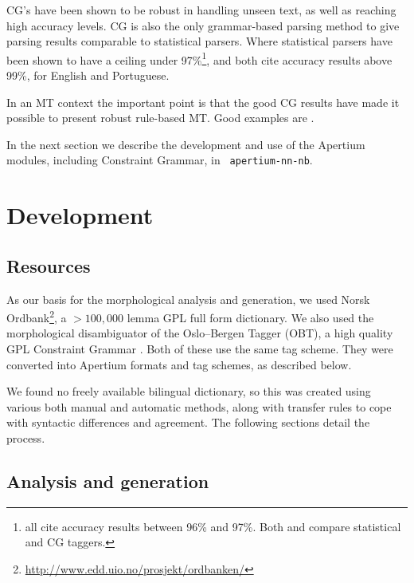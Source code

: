\documentclass[11pt]{article}
\begin{document}
CG's have been shown to be robust in handling unseen text, as well as
reaching high accuracy levels. CG is also the only grammar-based
parsing method to give parsing results comparable to statistical
parsers. Where statistical parsers have been shown to have a ceiling
under 97\%\footnote{\citet{leech1994claws, brants2000tnt,
    brill1997uld} all cite accuracy results between 96\% and
  97\%. Both \citet{chanod1995tfc} and \citet{samuelsson1997cls}
  compare statistical and CG taggers.},
\citet{voutilainen1994engcg} and \citet{bick2000palavras} both cite
accuracy results above 99\%, for English and Portuguese. 

In an MT context the important point is that the good CG results have 
made it possible to present robust rule-based MT. Good examples are
\citet{bick2007fmw}. %

In the next section we describe the development and use of the
Apertium modules, including Constraint Grammar, in {\tt
  apertium-nn-nb}.

\section{Development}

  \label{sec:development}
\subsection{Resources}

As our basis for the morphological analysis and generation, we used
Norsk
Ordbank\footnote{\href{http://www.edd.uio.no/prosjekt/ordbanken/}{http://www.edd.uio.no/prosjekt/ordbanken/}
}, a $>100,000$ lemma GPL full form dictionary. We also used the
morphological disambiguator of the Oslo–Bergen Tagger (OBT), a high
quality GPL Constraint Grammar \citep{hagen2000cbt}. Both of these use
the same tag scheme. They were converted into Apertium formats and tag
schemes, as described below.

We found no freely available bilingual dictionary, so this was created
using various both manual and automatic methods, along with transfer
rules to cope with syntactic differences and agreement. The following
sections detail the process.

\subsection{Analysis and generation}
\end{document}

